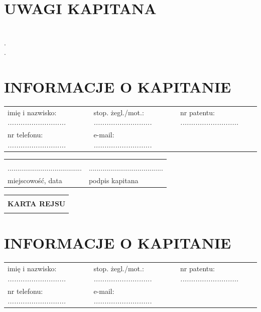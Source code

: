\documentclass{article}
\begin{document}
\section*{UWAGI KAPITANA}


\textit{}\dotfill \\
.\dotfill \\
.\dotfill \\
\section*{INFORMACJE O KAPITANIE}
\begin{tabularx}{\textwidth}{X X X}
imię i nazwisko: \textit{...........................} & stop. żegl./mot.: \textit{...........................} & nr patentu: \textit{...........................} \\
nr telefonu: \textit{...........................} & e-mail: \textit{...........................} \\
\end{tabularx}

\begin{tabularx}{\textwidth}{X X}
\\\\
...................................... & ......................................\\
miejscowość, data & podpis kapitana\\
\end{tabularx}
\newpage
\begin{tabularx}{\textwidth} { 
  | >{\centering\arraybackslash}X | }
 \hline
 \\
 \textbf{\huge KARTA REJSU} \\
 \\
\hline
\end{tabularx}

\section*{INFORMACJE O KAPITANIE}
\begin{tabularx}{\textwidth}{X X X}
imię i nazwisko: \textit{...........................} & stop. żegl./mot.: \textit{...........................} & nr patentu: \textit{...........................} \\
nr telefonu: \textit{...........................} & e-mail: \textit{...........................} \\
\end{tabularx}
\end{document}
